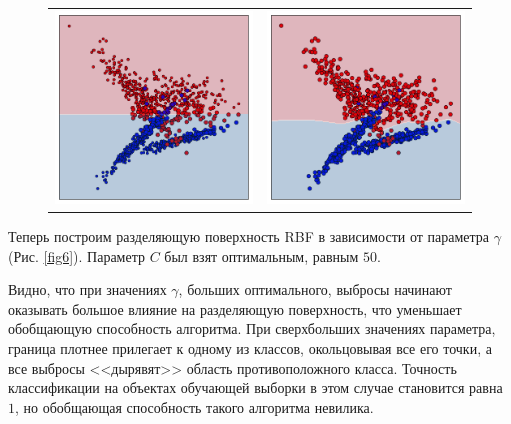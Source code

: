 \documentclass[12pt,fleqn,unicode]{article}
\begin{document}
\begin{figure}[h!]
\begin{tabular}{cc}
	\\
	\includegraphics[width=8cm]{../pict/nonsplit_lin.pdf} &
	\includegraphics[width=8cm]{../pict/nonsplit_rbf.pdf}
\end{tabular}
\end{figure}

Теперь построим разделяющую поверхность RBF в зависимости от параметра $\gamma$ (Рис. \ref{fig6}).
Параметр $C$ был взят оптимальным, равным $50$.

Видно, что при значениях $\gamma$, больших оптимального, выбросы начинают оказывать большое влияние
на разделяющую поверхность, что уменьшает обобщающую способность алгоритма. При сверхбольших
значениях параметра, граница плотнее прилегает к одному из классов, окольцовывая все его точки, а
все выбросы <<дырявят>> область противоположного класса. Точность классификации на объектах обучающей
выборки в этом случае становится равна $1$, но обобщающая способность такого алгоритма невилика.
\end{document}
